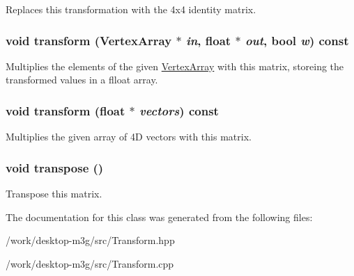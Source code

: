 Replaces this transformation with the 4x4 identity matrix. \hypertarget{classm3g_1_1Transform_557e326db393b8a1ce23455978af32dc}{
\subsubsection[{transform}]{\setlength{\rightskip}{0pt plus 5cm}void transform ({\bf VertexArray} $\ast$ {\em in}, \/  float $\ast$ {\em out}, \/  bool {\em w}) const}}
\label{classm3g_1_1Transform_557e326db393b8a1ce23455978af32dc}


Multiplies the elements of the given \hyperlink{classm3g_1_1VertexArray}{VertexArray} with this matrix, storeing the transformed values in a flloat array. \hypertarget{classm3g_1_1Transform_0b85978885624f651df63da4137692df}{
\subsubsection[{transform}]{\setlength{\rightskip}{0pt plus 5cm}void transform (float $\ast$ {\em vectors}) const}}
\label{classm3g_1_1Transform_0b85978885624f651df63da4137692df}


Multiplies the given array of 4D vectors with this matrix. \hypertarget{classm3g_1_1Transform_f3a99ffb20127be48232d12260e934dc}{
\subsubsection[{transpose}]{\setlength{\rightskip}{0pt plus 5cm}void transpose ()}}
\label{classm3g_1_1Transform_f3a99ffb20127be48232d12260e934dc}


Transpose this matrix. 

The documentation for this class was generated from the following files:\begin{CompactItemize}
\item 
/work/desktop-m3g/src/Transform.hpp\item 
/work/desktop-m3g/src/Transform.cpp\end{CompactItemize}
